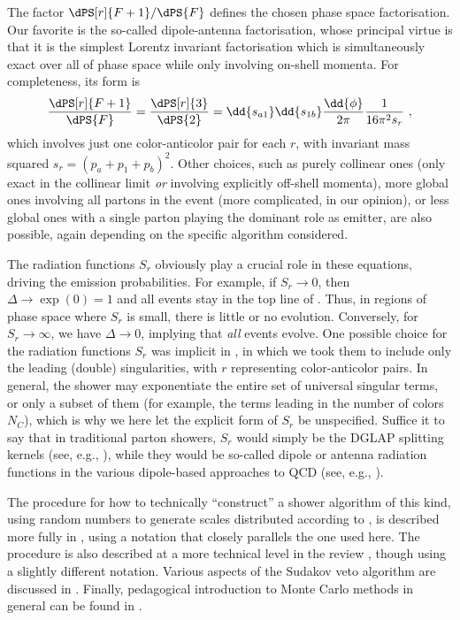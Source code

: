 The factor $\dPS[r]{F+1}/\dPS{F}$
defines the chosen phase space factorisation. Our favorite is the
so-called dipole-antenna factorisation, whose principal virtue is that
it is the simplest Lorentz invariant 
factorisation which is simultaneously exact over
all of phase space while only involving on-shell momenta. For
completeness, its form is
\begin{equation}  
\frac{\dPS[r]{F+1}}{\dPS{F}} = \frac{\dPS[r]{3}}{\dPS{2}} =
\dd{s_{a1}} \dd{s_{1b}} \frac{\dd{\phi}}{2\pi} \frac{1}{16\pi^2
  s_r}~, \label{eq:phasespace} 
\end{equation}
which involves just one color-anticolor pair for each $r$, with
invariant mass squared $s_r = (p_a+p_1+p_b)^2$. 
Other choices, such as purely collinear ones (only exact in the
collinear limit \emph{or} involving explicitly off-shell momenta), 
more global ones involving all partons in the event (more complicated,
in our opinion), or less global ones with a single parton playing the
dominant role as emitter, are also possible, again depending 
on the specific algorithm considered.

The radiation functions $S_r$ obviously play a crucial role in these
equations, driving the emission probabilities. For example, if 
$S_r \to 0$, then  $\Delta \to \exp(0) = 1$ and all events stay in the
top line of . Thus, in regions of phase  
space where $S_r$ is small, there is little or no evolution. 
Conversely, for $S_r\to \infty$, we have $\Delta\to 0$, implying that \emph{all}
events evolve. 
One possible choice for the radiation functions $S_r$ was
implicit in , in which we took them to include only
the leading 
(double) singularities, with $r$ representing color-anticolor
pairs. In general, the shower
may exponentiate the entire set of universal singular terms, or only
a subset of them (for example, the terms leading in the number of colors
$N_C$), which is why we here let the explicit form of $S_r$ be
unspecified. 
%
Suffice it to say that 
in traditional parton showers, $S_r$ would simply be the DGLAP
splitting kernels (see, e.g., \cite{Dissertori:2003pj}), 
%
while they would be so-called dipole or antenna radiation
functions in the various dipole-based approaches to QCD 
(see, e.g.,
\cite{Azimov:1986sf,Gustafson:1987rq,Catani:1996vz,GehrmannDeRidder:2005cm,Giele:2007di,Schumann:2007mg,Giele:2011cb,LopezVillarejo:2011ap}).   

The procedure for how to technically ``construct'' a shower algorithm
of this kind, using random numbers to generate scales distributed according to
, is described more fully in \cite{Giele:2011cb},
using a notation that closely parallels the one used here. The
procedure is also described at a more technical level in the review
\cite{Buckley:2011ms}, though using a slightly different
notation. Various aspects of the Sudakov veto algorithm are discussed
in \cite{Platzer:2011dq,Lonnblad:2012hz,Mrenna:2016sih}.
%
Finally, pedagogical introduction to Monte Carlo
methods in general can be found in \cite{James:1980yn,Weinzierl:2000wd}. 

